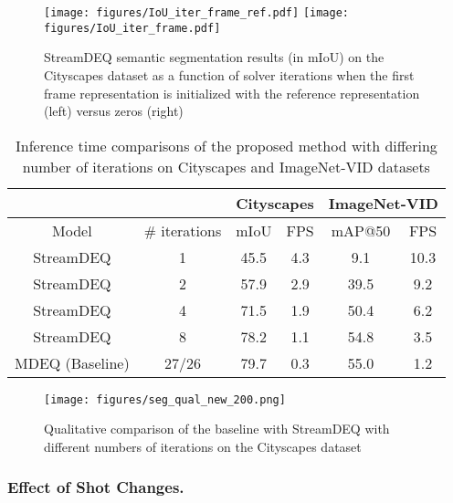 \documentclass[runningheads]{llncs}
\begin{document}
\begin{figure}[t]
    \centering
    \texttt{[image: figures/IoU\_iter\_frame\_ref.pdf]}
    \hfill
    \texttt{[image: figures/IoU\_iter\_frame.pdf]} 
\caption{StreamDEQ semantic segmentation results (in mIoU) on the Cityscapes dataset as a function of solver iterations when the first frame representation is initialized with the reference representation (left) versus zeros (right)}
\label{fig:seg_f_iou_iter}
\end{figure}


\setlength{\tabcolsep}{4pt}
\begin{table}[t]
\begin{center}
\caption{Inference time comparisons of the proposed method with differing number of iterations on Cityscapes and ImageNet-VID datasets}
\label{tab:inference_speed}
\begin{tabular}{cccccc}
\hline\noalign{\smallskip}
 & & \multicolumn{2}{c}{Cityscapes} & \multicolumn{2}{c}{ImageNet-VID} \\
\hline\noalign{\smallskip}
Model & \# iterations & mIoU & FPS & mAP@50 & FPS \\
\noalign{\smallskip}
\hline
\noalign{\smallskip}
StreamDEQ & 1 & 45.5 & 4.3 & 9.1 & 10.3 \\
StreamDEQ & 2 & 57.9 & 2.9 & 39.5 & 9.2 \\
StreamDEQ & 4 & 71.5 & 1.9 & 50.4 & 6.2 \\
StreamDEQ & 8 & 78.2 & 1.1 & 54.8 & 3.5 \\
MDEQ (Baseline) & 27/26 & 79.7 & 0.3 & 55.0 & 1.2 \\
\hline
\end{tabular}
\end{center}
\end{table}
\setlength{\tabcolsep}{1.4pt}


\begin{figure}[t]
\centering
\texttt{[image: figures/seg\_qual\_new\_200.png]}
\caption{Qualitative comparison of the baseline with StreamDEQ with different numbers of iterations on the Cityscapes dataset}
\label{fig:seg_qual}
\end{figure}


\subsubsection{Effect of Shot Changes.}
\end{document}
